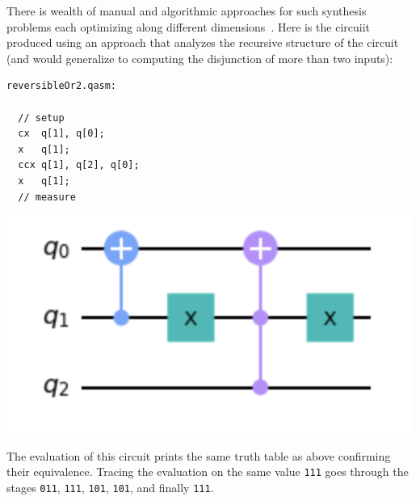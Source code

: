 There is wealth of manual and algorithmic approaches for such synthesis problems each optimizing along  different dimensions~\cite{XXX}. Here is the circuiit produced using an approach that analyzes the recursive structure of the circuit (and would generalize to computing the disjunction of more than two inputs):

\begin{center}
  \begin{minipage}[c]{0.4\linewidth}
\begin{verbatim}
reversibleOr2.qasm:

  // setup
  cx  q[1], q[0];
  x   q[1];
  ccx q[1], q[2], q[0];
  x   q[1];
  // measure
  \end{verbatim}
  \end{minipage}
  \qquad
  \includegraphics[scale=0.7]{reversibleOr2.png}
\end{center}

The evaluation of this circuit prints the same truth table as above confirming their equivalence. Tracing the evaluation on the same value \verb|111| goes through the stages \verb|011|, \verb|111|, \verb|101|, \verb|101|, and finally \verb|111|.

